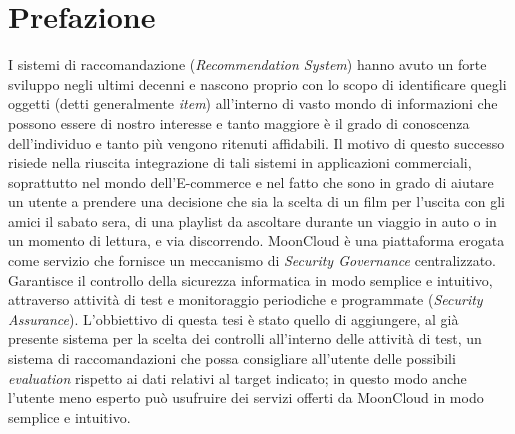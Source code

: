 \chapter{Prefazione}
I sistemi di raccomandazione (\textit{Recommendation System}) hanno avuto un forte sviluppo negli ultimi decenni e 
nascono proprio con lo scopo di identificare quegli oggetti (detti generalmente \textit{item}) all'interno di vasto 
mondo di informazioni che possono essere di nostro interesse e tanto maggiore è il grado di conoscenza dell'individuo 
e tanto più vengono ritenuti affidabili.
\newline
Il motivo di questo successo risiede nella riuscita integrazione di tali sistemi in applicazioni commerciali, 
soprattutto nel mondo dell’E-commerce e nel fatto che sono in grado di aiutare un utente a prendere una decisione 
che sia la scelta di un film per l'uscita con gli amici il sabato sera, di una playlist da ascoltare durante 
un viaggio in auto o in un momento di lettura, e via discorrendo. 
\newline
MoonCloud è una piattaforma erogata come servizio che fornisce un meccanismo di \textit{Security Governance} centralizzato. 
Garantisce il controllo della sicurezza informatica in modo semplice e intuitivo, attraverso attività di test e monitoraggio 
periodiche e programmate (\textit{Security Assurance}). L'obbiettivo di questa tesi è stato quello di aggiungere, al già 
presente sistema per la scelta dei controlli all'interno delle attività di test, un sistema di raccomandazioni che possa 
consigliare all'utente delle possibili \textit{evaluation} rispetto ai dati relativi al target indicato; in questo modo 
anche l'utente meno esperto può usufruire dei servizi offerti da MoonCloud in modo semplice e intuitivo.  


